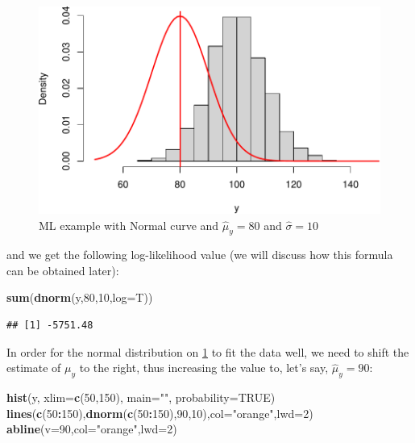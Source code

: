 \documentclass[
]{book}
\newenvironment{Shaded}{\begin{snugshade}}{\end{snugshade}}
\newcommand{\DataTypeTok}[1]{\textcolor[rgb]{0.13,0.29,0.53}{#1}}
\newcommand{\DecValTok}[1]{\textcolor[rgb]{0.00,0.00,0.81}{#1}}
\newcommand{\KeywordTok}[1]{\textcolor[rgb]{0.13,0.29,0.53}{\textbf{#1}}}
\newcommand{\NormalTok}[1]{#1}
\newcommand{\OperatorTok}[1]{\textcolor[rgb]{0.81,0.36,0.00}{\textbf{#1}}}
\newcommand{\OtherTok}[1]{\textcolor[rgb]{0.56,0.35,0.01}{#1}}
\newcommand{\StringTok}[1]{\textcolor[rgb]{0.31,0.60,0.02}{#1}}
\theoremstyle{definition}
\theoremstyle{definition}
\theoremstyle{definition}
\theoremstyle{definition}
\theoremstyle{remark}
\begin{document}
\begin{figure}
\centering
\includegraphics{Svetunkov---Statistics-for-Business-Analytics_files/figure-latex/MLENormalExample01-1.pdf}
\caption{\label{fig:MLENormalExample01}ML example with Normal curve and \(\hat{\mu}_y=80\) and \(\hat{\sigma}=10\)}
\end{figure}

and we get the following log-likelihood value (we will discuss how this formula can be obtained later):

\begin{Shaded}
\begin{Highlighting}[]
\KeywordTok{sum}\NormalTok{(}\KeywordTok{dnorm}\NormalTok{(y,}\DecValTok{80}\NormalTok{,}\DecValTok{10}\NormalTok{,}\DataTypeTok{log=}\NormalTok{T))}
\end{Highlighting}
\end{Shaded}

\begin{verbatim}
## [1] -5751.48
\end{verbatim}

In order for the normal distribution on \ref{fig:MLENormalExample01} to fit the data well, we need to shift the estimate of \(\mu_y\) to the right, thus increasing the value to, let's say, \(\hat{\mu}_y=90\):

\begin{Shaded}
\begin{Highlighting}[]
\KeywordTok{hist}\NormalTok{(y, }\DataTypeTok{xlim=}\KeywordTok{c}\NormalTok{(}\DecValTok{50}\NormalTok{,}\DecValTok{150}\NormalTok{), }\DataTypeTok{main=}\StringTok{""}\NormalTok{, }\DataTypeTok{probability=}\OtherTok{TRUE}\NormalTok{)}
\KeywordTok{lines}\NormalTok{(}\KeywordTok{c}\NormalTok{(}\DecValTok{50}\OperatorTok{:}\DecValTok{150}\NormalTok{),}\KeywordTok{dnorm}\NormalTok{(}\KeywordTok{c}\NormalTok{(}\DecValTok{50}\OperatorTok{:}\DecValTok{150}\NormalTok{),}\DecValTok{90}\NormalTok{,}\DecValTok{10}\NormalTok{),}\DataTypeTok{col=}\StringTok{"orange"}\NormalTok{,}\DataTypeTok{lwd=}\DecValTok{2}\NormalTok{)}
\KeywordTok{abline}\NormalTok{(}\DataTypeTok{v=}\DecValTok{90}\NormalTok{,}\DataTypeTok{col=}\StringTok{"orange"}\NormalTok{,}\DataTypeTok{lwd=}\DecValTok{2}\NormalTok{)}
\end{Highlighting}
\end{Shaded}
\end{document}
